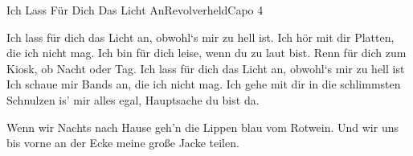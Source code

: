 \begin{song}{Ich Lass Für Dich Das Licht An}{Revolverheld}{Capo 4}

Ich lass für dich das Licht an, obwohl`s mir zu hell ist.
Ich hör mit dir Platten, die ich nicht mag.
Ich bin für dich leise, wenn du zu laut bist.
Renn für dich zum Kiosk, ob Nacht oder Tag.
Ich lass für dich das Licht an, obwohl`s mir zu hell ist
Ich schaue mir Bands an, die ich nicht mag.
Ich gehe mit dir in die schlimmsten Schnulzen
is' mir alles egal, Hauptsache du bist da.

Wenn wir Nachts nach Hause geh'n
die Lippen blau vom Rotwein.
Und wir uns bis vorne an der Ecke
meine große Jacke teilen.
\end{song}

